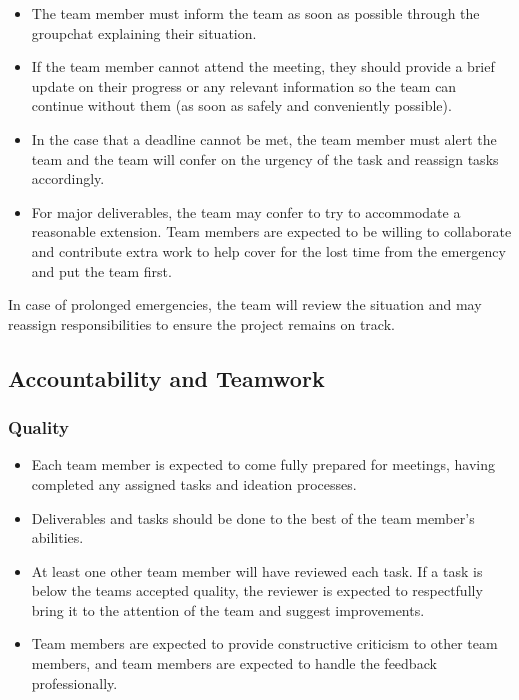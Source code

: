\documentclass{article}
\begin{document}
\begin{itemize}
    \item The team member must inform the team as soon as possible through the groupchat explaining their situation.
    \item If the team member cannot attend the meeting, they should provide a brief update on their progress or any relevant information so the team can continue without them (as soon as safely and conveniently possible).
    \item In the case that a deadline cannot be met, the team member must alert the team and the team will confer on the urgency of the task and reassign tasks accordingly.
    \item For major deliverables, the team may confer to try to accommodate a reasonable extension. Team members are expected to be willing to collaborate and contribute extra work to help cover for the lost time from the emergency and put the team first.
    
\end{itemize}
In case of prolonged emergencies, the team will review the situation and may reassign responsibilities to ensure the project remains on track.


\subsection*{Accountability and Teamwork}

\subsubsection*{Quality} 

\begin{itemize}
    \item Each team member is expected to come fully prepared for meetings, having completed any assigned tasks and ideation processes. 
    \item Deliverables and tasks should be done to the best of the team member's abilities.
    \item At least one other team member will have reviewed each task. If a task is below the teams accepted quality, the reviewer is expected to respectfully bring it to the attention of the team and suggest improvements.
    \item Team members are expected to provide constructive criticism to other team members, and team members are expected to handle the feedback professionally. 
\end{itemize}
\end{document}
